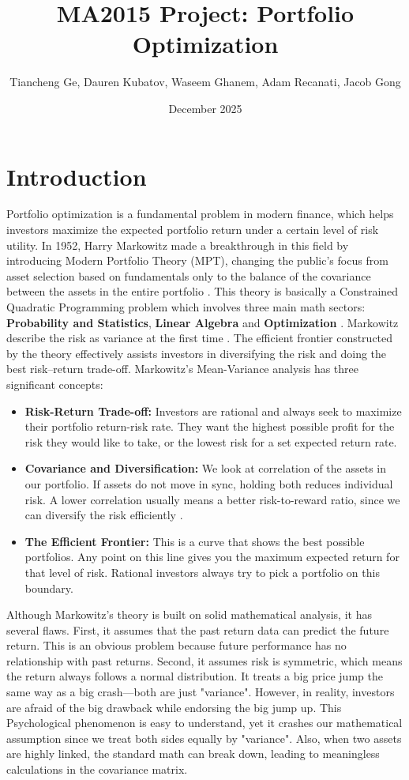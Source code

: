 \documentclass[12pt]{article}
\title{MA2015 Project: Portfolio Optimization}
\author{Tiancheng Ge, Dauren Kubatov, Waseem Ghanem, Adam Recanati, Jacob Gong}
\date{December 2025}
\begin{document}
\maketitle

\section{Introduction}

Portfolio optimization is a fundamental problem in modern finance, which helps investors maximize the expected portfolio return under a certain level of risk utility. In 1952, Harry Markowitz made a breakthrough in this field by introducing Modern Portfolio Theory (MPT), changing the public’s focus from asset selection based on fundamentals only to the balance of the covariance between the assets in the entire portfolio \cite{markowitz1952}. This theory is basically a Constrained Quadratic Programming problem which involves three main math sectors: \textbf{Probability and Statistics}, \textbf{Linear Algebra} and \textbf{Optimization} \cite{cornuejols2018}. Markowitz describe the risk as variance at the first time \cite{mankiw2017}. The efficient frontier constructed by the theory effectively assists investors in diversifying the risk and doing the best risk–return trade-off. Markowitz's Mean-Variance analysis has three significant concepts:

\begin{itemize} \item 
\textbf{Risk-Return Trade-off:} Investors are rational and always seek to maximize their portfolio return-risk rate. They want the highest possible profit for the risk they would like to take, or the lowest risk for a set expected return rate. 
\item \textbf{Covariance and Diversification:} We look at correlation of the assets in our portfolio. If assets do not move in sync, holding both reduces individual risk. A lower correlation usually means a better risk-to-reward ratio, since we can diversify the risk efficiently .
\item \textbf{The Efficient Frontier:} This is a curve that shows the best possible portfolios. Any point on this line gives you the maximum expected return for that level of risk. Rational investors always try to pick a portfolio on this boundary. 
\end{itemize}


Although Markowitz's theory is built on solid mathematical analysis, it has several flaws. First, it assumes that the past return data can predict the future return. This is an obvious problem because future performance has no relationship with past returns. Second, it assumes risk is symmetric, which means the return always follows a normal distribution.  It treats a big price jump the same way as a big crash—both are just "variance". However, in reality, investors are afraid of the big drawback while endorsing the big jump up. This Psychological phenomenon is easy to understand, yet it crashes our mathematical assumption since we treat both sides equally by "variance". Also, when two assets are highly linked, the standard math can break down, leading to meaningless calculations in the covariance matrix.
\end{document}
